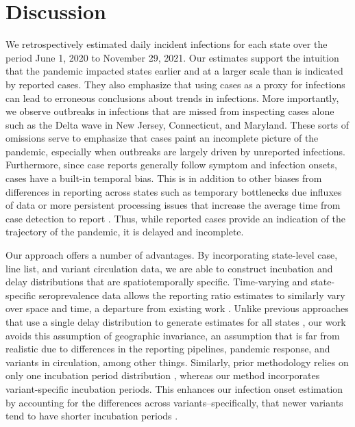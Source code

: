 \section{Discussion}

We retrospectively estimated daily incident infections for each \US state over
the period June 1, 2020 to November 29, 2021. Our estimates support the
intuition that the pandemic impacted states earlier and at a larger scale
than is indicated by reported cases. They also emphasize that using cases as a
proxy for infections can lead to erroneous conclusions about trends in infections.
More importantly, we observe outbreaks in infections that are missed from
inspecting cases alone such as the Delta wave in 
New Jersey, Connecticut, and Maryland.
These sorts of omissions serve to emphasize that cases paint an incomplete
picture of the pandemic, especially when outbreaks are largely driven by
unreported infections. Furthermore, since case reports generally follow symptom
and infection onsets, cases have a built-in temporal bias. This is in addition
to other biases from differences in reporting across states such as temporary
bottlenecks due influxes of data or more persistent processing issues that
increase the average time from case detection to report \citep{wash2020dash,
dunkel2020covid19}. Thus, while reported cases provide an indication of the
trajectory of the pandemic, it is delayed and incomplete.

Our approach offers a number of advantages. By incorporating state-level case,
line list, and variant circulation data, we are able to construct incubation and
delay distributions that are spatiotemporally specific. Time-varying and
state-specific seroprevalence data allows the reporting ratio estimates to
similarly vary over space and time, a departure from existing work
\citep{unwin2020state, uga2020covid19}. Unlike previous approaches that use a
single delay distribution to generate estimates for all states
\citep{chitwood2022reconstructing, jahja2022real, miller2022statistical}, our
work avoids this assumption of geographic invariance, an assumption that is far
from realistic due to differences in the reporting pipelines, pandemic response,
and variants in circulation, among other things. Similarly, prior methodology
relies on only one incubation period distribution \citep{miller2022statistical},
whereas our method incorporates variant-specific incubation periods. This
enhances our infection onset estimation by accounting for the differences across
variants--specifically, that newer variants tend to have shorter incubation
periods \citep{tanaka2022shorter, ogata2022shorter, wu2022incubation}.

